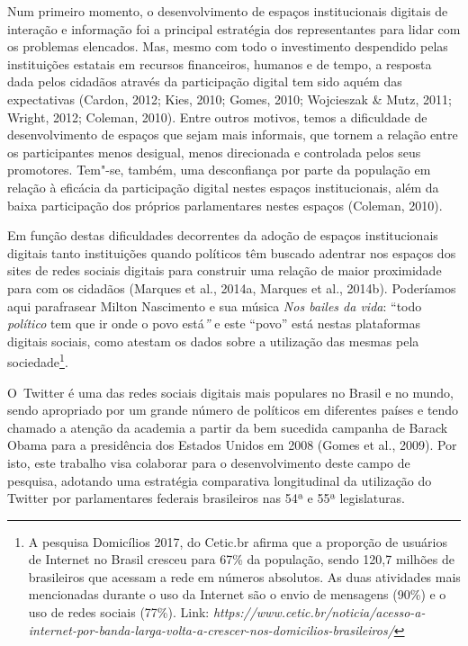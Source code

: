 Num primeiro momento, o desenvolvimento de espaços institucionais
digitais de interação e informação foi a principal estratégia dos
representantes para lidar com os problemas elencados. Mas, mesmo com
todo o investimento despendido pelas instituições estatais em recursos
financeiros, humanos e de tempo, a resposta dada pelos cidadãos através
da participação digital tem sido aquém das expectativas (Cardon, 2012;
Kies, 2010; Gomes, 2010; Wojcieszak \& Mutz, 2011; Wright, 2012;
Coleman, 2010). Entre outros motivos, temos a dificuldade de
desenvolvimento de espaços que sejam mais informais, que tornem a
relação entre os participantes menos desigual, menos direcionada e
controlada pelos seus promotores. Tem"-se, também, uma desconfiança por
parte da população em relação à eficácia da participação digital nestes
espaços institucionais, além da baixa participação dos próprios
parlamentares nestes espaços (Coleman, 2010).

Em função destas dificuldades decorrentes da adoção de espaços
institucionais digitais tanto instituições quando políticos têm buscado
adentrar nos espaços dos sites de redes sociais digitais para construir
uma relação de maior proximidade para com os cidadãos (Marques et al.,
2014a, Marques et al., 2014b). Poderíamos aqui parafrasear Milton
Nascimento e sua música \emph{Nos bailes da vida}: ``todo
\emph{político} tem que ir onde o povo está\emph{''} e este ``povo''
está nestas plataformas digitais sociais, como atestam os dados sobre a
utilização das mesmas pela sociedade\footnote{A pesquisa  Domicílios
  2017, do Cetic.br afirma que a proporção de usuários de Internet no
  Brasil cresceu para 67\% da população, sendo 120,7 milhões de
  brasileiros que acessam a rede em números absolutos. As duas
  atividades mais mencionadas durante o uso da Internet são o envio de
  mensagens (90\%) e o uso de redes sociais (77\%). Link:
  \emph{https://www.cetic.br/noticia/acesso-a-internet-por-banda-larga-volta-a-crescer-nos-domicilios-brasileiros/}}.

O~Twitter é uma das redes sociais digitais mais populares no Brasil e no
mundo, sendo apropriado por um grande número de políticos em diferentes
países e tendo chamado a atenção da academia a partir da bem sucedida
campanha de Barack Obama para a presidência dos Estados Unidos em 2008
(Gomes et al., 2009). Por isto, este trabalho visa colaborar para o
desenvolvimento deste campo de pesquisa, adotando uma estratégia
comparativa longitudinal da utilização do Twitter por parlamentares
federais brasileiros nas 54ª e 55ª legislaturas.

